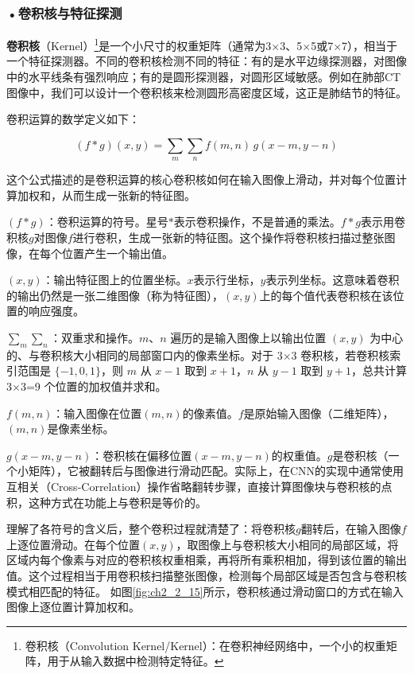 \subsubsection*{\textbf{•卷积核与特征探测}}

\textbf{卷积核}（Kernel）\footnote{卷积核（Convolution Kernel/Kernel）：在卷积神经网络中，一个小的权重矩阵，用于从输入数据中检测特定特征。}是一个小尺寸的权重矩阵（通常为3×3、5×5或7×7），相当于一个特征探测器。不同的卷积核检测不同的特征：有的是水平边缘探测器，对图像中的水平线条有强烈响应；有的是圆形探测器，对圆形区域敏感。例如在肺部CT图像中，我们可以设计一个卷积核来检测圆形高密度区域，这正是肺结节的特征。

卷积运算的数学定义如下：

\[
(f * g)(x, y) = \sum_{m} \sum_{n} f(m, n) \, g(x - m, y - n)
\]

这个公式描述的是卷积运算的核心卷积核如何在输入图像上滑动，并对每个位置计算加权和，从而生成一张新的特征图。



$(f * g)$：卷积运算的符号。星号$*$表示卷积操作，不是普通的乘法。$f * g$表示用卷积核$g$对图像$f$进行卷积，生成一张新的特征图。这个操作将卷积核扫描过整张图像，在每个位置产生一个输出值。

$(x, y)$：输出特征图上的位置坐标。$x$表示行坐标，$y$表示列坐标。这意味着卷积的输出仍然是一张二维图像（称为特征图），$(x, y)$上的每个值代表卷积核在该位置的响应强度。

$\sum_{m} \sum_{n}$：双重求和操作。$m$、$n$ 遍历的是输入图像上以输出位置 $(x, y)$ 为中心的、与卷积核大小相同的局部窗口内的像素坐标。对于 3×3 卷积核，若卷积核索引范围是 $\{-1, 0, 1\}$，则 $m$ 从 $x-1$ 取到 $x+1$，$n$ 从 $y-1$ 取到 $y+1$，总共计算 3×3=9 个位置的加权值并求和。

$f(m, n)$：输入图像在位置$(m, n)$的像素值。$f$是原始输入图像（二维矩阵），$(m, n)$是像素坐标。

$g(x - m, y - n)$：卷积核在偏移位置$(x-m, y-n)$的权重值。$g$是卷积核（一个小矩阵），它被翻转后与图像进行滑动匹配。实际上，在CNN的实现中通常使用互相关（Cross-Correlation）操作省略翻转步骤，直接计算图像块与卷积核的点积，这种方式在功能上与卷积是等价的。

理解了各符号的含义后，整个卷积过程就清楚了：将卷积核$g$翻转后，在输入图像$f$上逐位置滑动。在每个位置$(x, y)$，取图像上与卷积核大小相同的局部区域，将区域内每个像素与对应的卷积核权重相乘，再将所有乘积相加，得到该位置的输出值。这个过程相当于用卷积核扫描整张图像，检测每个局部区域是否包含与卷积核模式相匹配的特征。
如图\ref{fig:ch2_2_15}所示，卷积核通过滑动窗口的方式在输入图像上逐位置计算加权和。

